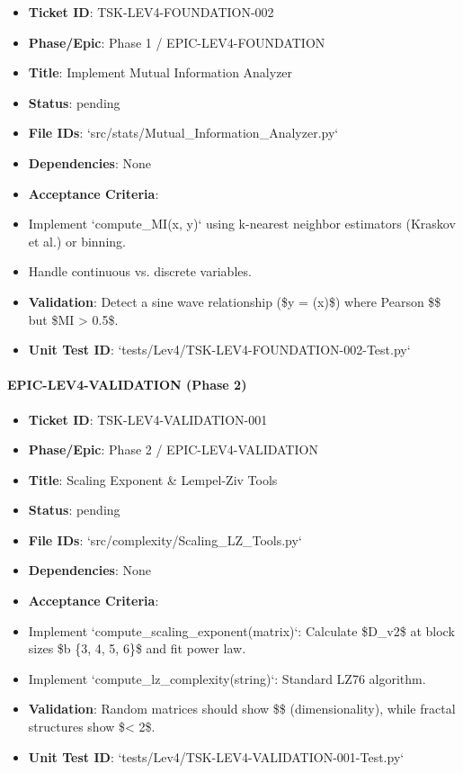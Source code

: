 \documentclass{article}
\begin{document}
\begin{itemize}
\item   \textbf{Ticket ID}: TSK-LEV4-FOUNDATION-002
\item   \textbf{Phase/Epic}: Phase 1 / EPIC-LEV4-FOUNDATION
\item   \textbf{Title}: Implement Mutual Information Analyzer
\item   \textbf{Status}: pending
\item   \textbf{File IDs}: `src/stats/Mutual\_Information\_Analyzer.py`
\item   \textbf{Dependencies}: None
\item   \textbf{Acceptance Criteria}:
\item   Implement `compute\_MI(x, y)` using k-nearest neighbor estimators (Kraskov et al.) or binning.
\item   Handle continuous vs. discrete variables.
\item   \textbf{Validation}: Detect a sine wave relationship (\$y = \sin(x)\$) where Pearson \$\rho {}\$ but \$MI > 0.5\$.
\item   \textbf{Unit Test ID}: `tests/Lev4/TSK-LEV4-FOUNDATION-002-Test.py`
\end{itemize}

\paragraph{EPIC-LEV4-VALIDATION (Phase 2)}

\begin{itemize}
\item   \textbf{Ticket ID}: TSK-LEV4-VALIDATION-001
\item   \textbf{Phase/Epic}: Phase 2 / EPIC-LEV4-VALIDATION
\item   \textbf{Title}: Scaling Exponent \& Lempel-Ziv Tools
\item   \textbf{Status}: pending
\item   \textbf{File IDs}: `src/complexity/Scaling\_LZ\_Tools.py`
\item   \textbf{Dependencies}: None
\item   \textbf{Acceptance Criteria}:
\item   Implement `compute\_scaling\_exponent(matrix)`: Calculate \$D\_{v2}\$ at block sizes \$b \in \{3, 4, 5, 6\}\$ and fit power law.
\item   Implement `compute\_lz\_complexity(string)`: Standard LZ76 algorithm.
\item   \textbf{Validation}: Random matrices should show \$\alpha {}\$ (dimensionality), while fractal structures show \$\alpha < 2\$.
\item   \textbf{Unit Test ID}: `tests/Lev4/TSK-LEV4-VALIDATION-001-Test.py`
\end{itemize}
\end{document}
